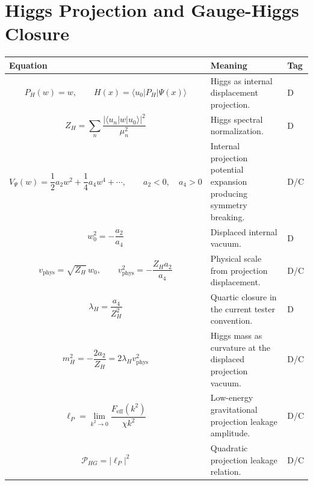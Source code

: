 \documentclass[11pt]{article}
\newcommand{\eff}{\mathrm{eff}}
\newcommand{\phys}{\mathrm{phys}}
\begin{document}
\section{Higgs Projection and Gauge-Higgs Closure}
\begin{longtable}{>{\raggedright\arraybackslash}p{} >{\raggedright\arraybackslash}p{} >{\centering\arraybackslash}p{}}
\toprule
\textbf{Equation} & \textbf{Meaning} & \textbf{Tag} \\
\midrule
\endhead

\begin{equation}
P_H(w)=w,
\qquad H(x)=\langle u_0|P_H|\Psi(x)\rangle
\end{equation}
& Higgs as internal displacement projection. & D \\

\begin{equation}
Z_H=\sum_n\frac{|\langle u_n|w|u_0\rangle|^2}{\mu_n^2}
\end{equation}
& Higgs spectral normalization. & D \\

\begin{equation}
V_\Psi(w)=\frac12a_2w^2+\frac14a_4w^4+\cdots,
\qquad a_2<0,\quad a_4>0
\end{equation}
& Internal projection potential expansion producing symmetry breaking. & D/C \\

\begin{equation}
w_0^2=-\frac{a_2}{a_4}
\end{equation}
& Displaced internal vacuum. & D \\

\begin{equation}
v_{\phys}=\sqrt{Z_H}\,w_0,
\qquad v_{\phys}^2=-\frac{Z_Ha_2}{a_4}
\end{equation}
& Physical scale from projection displacement. & D/C \\

\begin{equation}
\lambda_H=\frac{a_4}{Z_H^2}
\end{equation}
& Quartic closure in the current tester convention. & D \\

\begin{equation}
m_H^2=-\frac{2a_2}{Z_H}=2\lambda_H v_{\phys}^2
\end{equation}
& Higgs mass as curvature at the displaced projection vacuum. & D/C \\

\begin{equation}
\ell_P=\lim_{k^2\rightarrow0}\frac{F_{\eff}(k^2)}{\chi k^2}
\end{equation}
& Low-energy gravitational projection leakage amplitude. & D/C \\

\begin{equation}
\mathcal P_{HG}=|\ell_P|^2
\end{equation}
& Quadratic projection leakage relation. & D/C \\

\bottomrule
\end{longtable}
\end{document}
